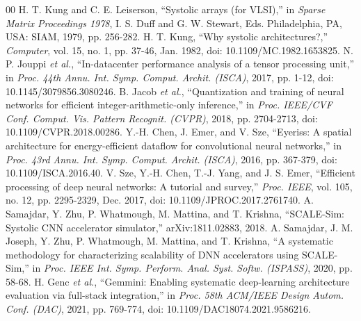 \documentclass[conference]{IEEEtran}
\begin{document}
\begin{thebibliography}{00}
 H. T. Kung and C. E. Leiserson, ``Systolic arrays (for VLSI),'' in \emph{Sparse Matrix Proceedings 1978}, I. S. Duff and G. W. Stewart, Eds. Philadelphia, PA, USA: SIAM, 1979, pp. 256-282.
 H. T. Kung, ``Why systolic architectures?,'' \emph{Computer}, vol. 15, no. 1, pp. 37-46, Jan. 1982, doi: 10.1109/MC.1982.1653825.
 N. P. Jouppi \emph{et al.}, ``In-datacenter performance analysis of a tensor processing unit,'' in \emph{Proc. 44th Annu. Int. Symp. Comput. Archit. (ISCA)}, 2017, pp. 1-12, doi: 10.1145/3079856.3080246.
 B. Jacob \emph{et al.}, ``Quantization and training of neural networks for efficient integer-arithmetic-only inference,'' in \emph{Proc. IEEE/CVF Conf. Comput. Vis. Pattern Recognit. (CVPR)}, 2018, pp. 2704-2713, doi: 10.1109/CVPR.2018.00286.
 Y.-H. Chen, J. Emer, and V. Sze, ``Eyeriss: A spatial architecture for energy-efficient dataflow for convolutional neural networks,'' in \emph{Proc. 43rd Annu. Int. Symp. Comput. Archit. (ISCA)}, 2016, pp. 367-379, doi: 10.1109/ISCA.2016.40.
 V. Sze, Y.-H. Chen, T.-J. Yang, and J. S. Emer, ``Efficient processing of deep neural networks: A tutorial and survey,'' \emph{Proc. IEEE}, vol. 105, no. 12, pp. 2295-2329, Dec. 2017, doi: 10.1109/JPROC.2017.2761740.
 A. Samajdar, Y. Zhu, P. Whatmough, M. Mattina, and T. Krishna, ``SCALE-Sim: Systolic CNN accelerator simulator,'' arXiv:1811.02883, 2018.
 A. Samajdar, J. M. Joseph, Y. Zhu, P. Whatmough, M. Mattina, and T. Krishna, ``A systematic methodology for characterizing scalability of DNN accelerators using SCALE-Sim,'' in \emph{Proc. IEEE Int. Symp. Perform. Anal. Syst. Softw. (ISPASS)}, 2020, pp. 58-68.
 H. Genc \emph{et al.}, ``Gemmini: Enabling systematic deep-learning architecture evaluation via full-stack integration,'' in \emph{Proc. 58th ACM/IEEE Design Autom. Conf. (DAC)}, 2021, pp. 769-774, doi: 10.1109/DAC18074.2021.9586216.
\end{thebibliography}
\end{document}
